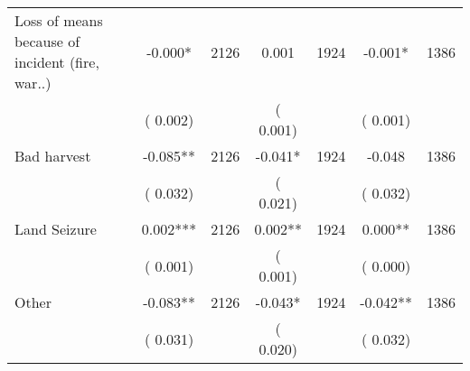 \begin{tabular}{l*{6}{c}}
Loss of means because of incident (fire, war..)        &             -0.000*      &       2126       &              0.001      &       1924       &             -0.001*      &       1386       \\
                       &       (       0.002)            &                               &       (       0.001)            &                               &       (       0.001)            &                               \\
Bad harvest        &             -0.085**      &       2126       &             -0.041*      &       1924       &             -0.048      &       1386       \\
                       &       (       0.032)            &                               &       (       0.021)            &                               &       (       0.032)            &                               \\
Land Seizure        &              0.002***      &       2126       &              0.002**      &       1924       &              0.000**      &       1386       \\
                       &       (       0.001)            &                               &       (       0.001)            &                               &       (       0.000)            &                               \\
Other        &             -0.083**      &       2126       &             -0.043*      &       1924       &             -0.042**      &       1386       \\
                       &       (       0.031)            &                               &       (       0.020)            &                               &       (       0.032)            &                               \\
\hline \end{tabular}